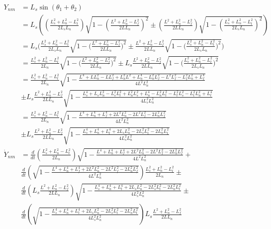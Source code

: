 \documentclass[11pt, landscape]{article}
\begin{document}
\begin{align}
  Y_{nm} &= L_s\sin(\theta_1 + \theta_2)\\
  &= L_s\left(\left(\frac{L_{s}^2+L_{n}^2-L_{t}^2}{2L_{s}L_{n}}\right)\sqrt{1-\left(\frac{L^2+L_{n}^2-L_{f}^2}{2LL_{n}}\right)^2} \pm \left(\frac{L^2+L_{n}^2-L_{f}^2}{2LL_{n}}\right)\sqrt{1-\left(\frac{L_{s}^2+L_{n}^2-L_{t}^2}{2L_{s}L_{n}}\right)^2}\right)\\
  &= L_{s}\Bigg(\frac{L_{s}^2+L_{n}^2-L_{t}^2}{2L_{s}L_{n}}\sqrt{1-\bigg(\frac{L^2+L_{n}^2-L_{f}^2}{2LL_{n}}\bigg)^2} \pm \frac{L^2+L_{n}^2-L_{f}^2}{2LL_{n}}\sqrt{1-\bigg(\frac{L_{s}^2+L_{n}^2-L_{t}^2}{2L_{s}L_{n}}\bigg)^2} \Bigg)\\
  &= \frac{L_{s}^2+L_{n}^2-L_{t}^2}{2L_{n}}\sqrt{1-\bigg(\frac{L^2+L_{n}^2-L_{f}^2}{2LL_{n}}\bigg)^2} \pm L_s\frac{L^2+L_{n}^2-L_{f}^2}{2LL_{n}}\sqrt{1-\bigg(\frac{L_{s}^2+L_{n}^2-L_{t}^2}{2L_{s}L_{n}}\bigg)^2}\\
  &= \frac{L_{s}^2+L_{n}^2-L_{t}^2}{2L_{n}}\sqrt{1-\frac{L^4 + LL_n^2 - LL_f^2 + L_n^2L^2 + L_n^4 - L_n^2L_f^2 - L^2L_f^2 - L_f^2L_n^2 + L_f^4}{4L^2L_n^2}} \\&\pm L_s\frac{L^2+L_{n}^2-L_{f}^2}{2LL_{n}}\sqrt{1-\frac{L_s^4 + L_sL_n^2 - L_s^2L_t^2 + L_n^2L_s^2 + L_n^4 - L_n^2L_t^2 - L_t^2L_s^2 - L_t^2L_n^2 + L_t^4}{4L_s^2L_n^2}}\\
  &= \frac{L_{s}^2+L_{n}^2-L_{t}^2}{2L_{n}}\sqrt{1-\frac{L^4 + L_n^4 + L_f^4 + 2L^2L_n^2 - 2L^2L_f^2 - 2L_n^2L_f^2}{4L^2L_n^2}} \\&\pm L_s\frac{L^2+L_{n}^2-L_{f}^2}{2LL_{n}}\sqrt{1-\frac{L_s^4 + L_n^4 + L_t^4 + 2L_sL_n^2 - 2L_s^2L_t^2 - 2L_n^2L_t^2}{4L_s^2L_n^2}}\\
  \dot{Y}_{nm} &=
  \frac{d}{dt}\left(\frac{L_{s}^2+L_{n}^2-L_{t}^2}{2L_{n}}\right)\sqrt{1-\frac{L^4 + L_n^4 + L_f^4 + 2L^2L_n^2 - 2L^2L_f^2 - 2L_n^2L_f^2}{4L^2L_n^2}} +\\
  &\frac{d}{dt}\left(\sqrt{1-\frac{L^4 + L_n^4 + L_f^4 + 2L^2L_n^2 - 2L^2L_f^2 - 2L_n^2L_f^2}{4L^2L_n^2}}\right)\frac{L_{s}^2+L_{n}^2-L_{t}^2}{2L_{n}} \pm\\
  &\frac{d}{dt}\left(L_s\frac{L^2+L_{n}^2-L_{f}^2}{2LL_{n}}\right)\sqrt{1-\frac{L_s^4 + L_n^4 + L_t^4 + 2L_sL_n^2 - 2L_s^2L_t^2 - 2L_n^2L_t^2}{4L_s^2L_n^2}} \pm\\
  &\frac{d}{dt}\left(\sqrt{1-\frac{L_s^4 + L_n^4 + L_t^4 + 2L_sL_n^2 - 2L_s^2L_t^2 - 2L_n^2L_t^2}{4L_s^2L_n^2}}\right)L_s\frac{L^2+L_{n}^2-L_{f}^2}{2LL_{n}}\\
\end{align}
\end{document}
